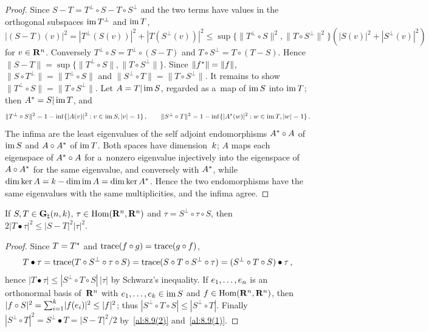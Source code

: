 \begin{proof}
    Since $S - T = T^\perp \circ S - T \circ S^\perp$ and the two terms have values in the
    orthogonal subspaces $\operatorname{im} T^\perp$ and $\operatorname{im} T$,
    \begin{displaymath}
        |(S - T)(v)|^2 = |T^\perp(S(v))|^2 + |T(S^\perp(v))|^2 \le \sup \{ \|T^\perp \circ S\|^2,
        \|T \circ S^\perp\|^2 \} (|S(v)|^2 + |S^\perp(v)|^2)
    \end{displaymath}
    for $v \in \mathbf{R}^{n}$. Conversely $T^\perp \circ S = T^\perp \circ (S - T)$ and $T \circ
    S^\perp = T \circ (T - S)$. Hence $\|S - T\| = \sup \{ \|T^\perp \circ S\|, \|T \circ
    S^\perp\| \}$. Since $\|f^{*}\| = \|f\|$, $\|S \circ T^\perp\| = \|T^\perp \circ S\|$
    and $\|S^\perp \circ T\| = \|T \circ S^\perp\|$. It remains to show $\|T^\perp \circ S\| =
    \|T \circ S^\perp\|$. Let $A = T | \operatorname{im} S$, regarded as a~map of $\operatorname{im} S$ into $\operatorname{im} T$; then
    $A^{*} = S | \operatorname{im} T$, and
    \begin{displaymath}
        \|T^\perp \circ S\|^2 = 1 - \inf \{ |A(v)|^2 : v \in \operatorname{im} S, |v| = 1 \} \,, \qquad \|S^\perp
        \circ T\|^2 = 1 - \inf \{ |A^{*}(w)|^2 : w \in \operatorname{im} T, |w| = 1 \} \,.
    \end{displaymath}
    The infima are the least eigenvalues of the self adjoint endomorphisms $A^{*} \circ A$
    of $\operatorname{im} S$ and $A \circ A^{*}$ of $\operatorname{im} T$. Both spaces have dimension~$k$; $A$ maps
    each eigenspace of $A^{*} \circ A$ for a~nonzero eigenvalue injectively into the
    eigenspace of $A \circ A^{*}$ for the same eigenvalue, and conversely with
    $A^{*}$, while $\dim \ker A = k - \dim \operatorname{im} A = \dim \ker A^{*}$. Hence the
    two endomorphisms have the same eigenvalues with the same multiplicities, and the infima agree.
\end{proof}

\begin{lemma}
    \label{al:8.9(4)}
    If $S, T \in \mathbf{G}_{\natural}(n,k)$, $\tau \in \operatorname{Hom}(\mathbf{R}^{n},\mathbf{R}^{n})$ and $\tau = S^\perp
    \circ \tau \circ S$, then $2 |T \bullet \tau|^2 \le |S - T|^2 |\tau|^2$.
\end{lemma}

\begin{proof}
    Since $T = T^{*}$ and $\operatorname{trace}(f \circ g) = \operatorname{trace}(g \circ f)$,
    \begin{displaymath}
        T \bullet \tau = \operatorname{trace}(T \circ S^\perp \circ \tau \circ S) = \operatorname{trace}(S \circ T \circ S^\perp
        \circ \tau) = (S^\perp \circ T \circ S) \bullet \tau \,,
    \end{displaymath}
    hence $|T \bullet \tau| \le |S^\perp \circ T \circ S| \, |\tau|$ by Schwarz's inequality. If
    $e_1, \ldots, e_{n}$ is an orthonormal basis of~$\mathbf{R}^{n}$ with $e_1, \ldots, e_{k} \in
    \operatorname{im} S$ and $f \in \operatorname{Hom}(\mathbf{R}^{n},\mathbf{R}^{n})$, then $|f \circ S|^2 = {\textstyle\sum_{i=1}^{k}}
    |f(e_i)|^2 \le |f|^2$; thus $|S^\perp \circ T \circ S| \le |S^\perp \circ T|$. Finally $|S^\perp
    \circ T|^2 = S^\perp \bullet T = |S - T|^2/2$ by~\ref{al:8.9(2)} and~\ref{al:8.9(1)}.
\end{proof}


